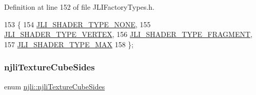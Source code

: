 Definition at line 152 of file J\+L\+I\+Factory\+Types.\+h.


\begin{DoxyCode}
153   \{
154     \mbox{\hyperlink{namespacenjli_a8f2b6cfac9213576c34bcf711ac39fbda359cca691366bd9b00991c1ba19dbbfb}{JLI\_SHADER\_TYPE\_NONE}},
155     \mbox{\hyperlink{namespacenjli_a8f2b6cfac9213576c34bcf711ac39fbda2b0d4740bfc8bf1f47d35fbede6cc6b4}{JLI\_SHADER\_TYPE\_VERTEX}},
156     \mbox{\hyperlink{namespacenjli_a8f2b6cfac9213576c34bcf711ac39fbda446314814389da25bab90e8855a6d3d8}{JLI\_SHADER\_TYPE\_FRAGMENT}},
157     \mbox{\hyperlink{namespacenjli_a8f2b6cfac9213576c34bcf711ac39fbdacb23a15dc0db4135eafa2ae034658564}{JLI\_SHADER\_TYPE\_MAX}}
158   \};
\end{DoxyCode}
\mbox{\label{namespacenjli_a3287657f79ee806953cdf2a3e719a9dd}} 
\subsubsection{\texorpdfstring{njli\+Texture\+Cube\+Sides}{njliTextureCubeSides}}
{\footnotesize\ttfamily enum \mbox{\hyperlink{namespacenjli_a3287657f79ee806953cdf2a3e719a9dd}{njli\+::njli\+Texture\+Cube\+Sides}}}

